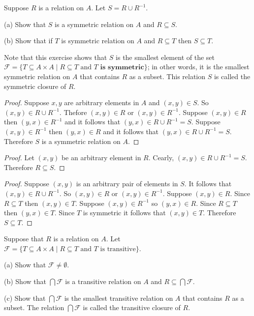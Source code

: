 \begin{tcolorbox}[title=Problem 24, breakable]
    Suppose $R$ is a relation on $A$. Let $S = R \cup R^{-1}$.

    (a) Show that $S$ is a symmetric relation on $A$ and $R \subseteq S$.

    (b) Show that if $T$ is symmetric relation on $A$ and $R \subseteq T$
        then $S \subseteq T$.

    Note that this exercise shows that $S$ is the smallest element of the set 
    $\mathcal{F} = \{T \subseteq A \times A \mid R \subseteq T \text{ and } T \textbf{ is symmetric}\}$;
    in other words, it is the smallest symmetric relation on $A$ that contains $R$ as a subset. This 
    relation $S$ is called the symmetric closure of $R$.
\end{tcolorbox}

\begin{proof}
    Suppose $x, y$ are arbitrary elements in $A$ and $(x, y) \in S$.
    So $(x, y) \in R \cup R^{-1}$.
    Thefore $(x, y) \in R$ or $(x, y) \in R^{-1}$.
    Suppose $(x, y) \in R$ then $(y, x) \in R^{-1}$
        and it follows that $(y, x) \in R \cup R^{-1} = S$.
    Suppose $(x, y) \in R^{-1}$ then $(y, x) \in R$
        and it follows that $(y, x) \in R \cup R^{-1} = S$.
    Therefore $S$ is a symmetric relation on $A$.
\end{proof}

\begin{proof}
    Let $(x, y)$ be an arbitrary element in $R$.
    Cearly, $(x, y) \in R \cup R^{-1} = S$.
    Therefore $R \subseteq S$.
\end{proof}

\begin{proof}
    Suppose $(x, y)$ is an arbitrary pair of elements in $S$.
    It follows that $(x, y) \in R \cup R^{-1}$.
    So $(x, y) \in R$ or $(x, y) \in R^{-1}$.
    Suppose $(x, y) \in R$.
    Since $R \subseteq T$ then $(x, y) \in T$.
    Suppose $(x, y) \in R^{-1}$ so $(y, x) \in R$.
    Since $R \subseteq T$ then $(y, x) \in T$.
    Since $T$ is symmetric it follows that $(x, y) \in T$.
    Therefore $S \subseteq T$.
\end{proof}

\begin{tcolorbox}[title=Problem 25, breakable]
    Suppose that $R$ is a relation on $A$. Let $\mathcal{F} = \{T \subseteq A \times A \mid R \subseteq T
    \text{ and } T \text{ is transitive}\}$.

    (a) Show that $\mathcal{F} \not = \emptyset$.

    (b) Show that $\bigcap \mathcal{F}$ is a transitive relation on $A$ and $R \subseteq \bigcap \mathcal{F}$.
    
    (c) Show that $\bigcap \mathcal{F}$ is the smallest transitive relation on $A$ that contains $R$ 
        as a subset. The relation $\bigcap \mathcal{F}$ is called the transitive closure of $R$.
\end{tcolorbox}

